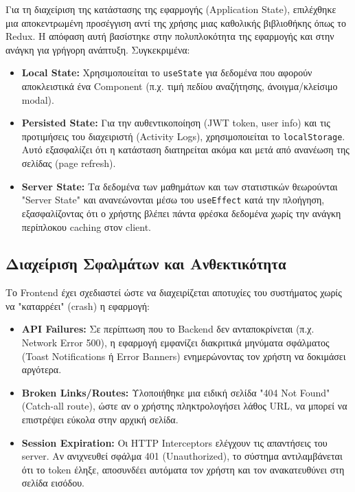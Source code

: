 \documentclass[a4paper,12pt]{article}
\begin{document}
Για τη διαχείριση της κατάστασης της εφαρμογής (Application State), επιλέχθηκε μια αποκεντρωμένη προσέγγιση αντί της χρήσης μιας καθολικής βιβλιοθήκης όπως το Redux. Η απόφαση αυτή βασίστηκε στην πολυπλοκότητα της εφαρμογής και στην ανάγκη για γρήγορη ανάπτυξη. Συγκεκριμένα:

\begin{itemize}
    \item \textbf{Local State:} Χρησιμοποιείται το \texttt{useState} για δεδομένα που αφορούν αποκλειστικά ένα Component (π.χ. τιμή πεδίου αναζήτησης, άνοιγμα/κλείσιμο modal).
    \item \textbf{Persisted State:} Για την αυθεντικοποίηση (JWT token, user info) και τις προτιμήσεις του διαχειριστή (Activity Logs), χρησιμοποιείται το \texttt{localStorage}. Αυτό εξασφαλίζει ότι η κατάσταση διατηρείται ακόμα και μετά από ανανέωση της σελίδας (page refresh).
    \item \textbf{Server State:} Τα δεδομένα των μαθημάτων και των στατιστικών θεωρούνται "Server State" και ανανεώνονται μέσω του \texttt{useEffect} κατά την πλοήγηση, εξασφαλίζοντας ότι ο χρήστης βλέπει πάντα φρέσκα δεδομένα χωρίς την ανάγκη περίπλοκου caching στον client.
\end{itemize}

\subsection{Διαχείριση Σφαλμάτων και Ανθεκτικότητα}

Το Frontend έχει σχεδιαστεί ώστε να διαχειρίζεται αποτυχίες του συστήματος χωρίς να "καταρρέει" (crash) η εφαρμογή:

\begin{itemize}
    \item \textbf{API Failures:} Σε περίπτωση που το Backend δεν ανταποκρίνεται (π.χ. Network Error 500), η εφαρμογή εμφανίζει διακριτικά μηνύματα σφάλματος (Toast Notifications ή Error Banners) ενημερώνοντας τον χρήστη να δοκιμάσει αργότερα.
    \item \textbf{Broken Links/Routes:} Υλοποιήθηκε μια ειδική σελίδα "404 Not Found" (Catch-all route), ώστε αν ο χρήστης πληκτρολογήσει λάθος URL, να μπορεί να επιστρέψει εύκολα στην αρχική σελίδα.
    \item \textbf{Session Expiration:} Οι HTTP Interceptors ελέγχουν τις απαντήσεις του server. Αν ανιχνευθεί σφάλμα 401 (Unauthorized), το σύστημα αντιλαμβάνεται ότι το token έληξε, αποσυνδέει αυτόματα τον χρήστη και τον ανακατευθύνει στη σελίδα εισόδου.
\end{itemize}
\end{document}
